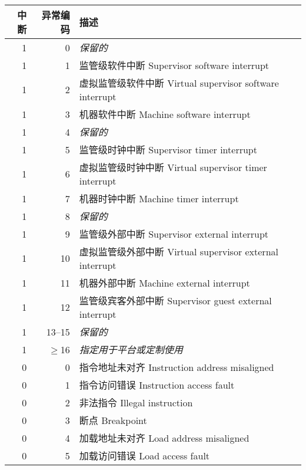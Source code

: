 \begin{table*}[p]
\begin{center}
\begin{tabular}{|r|r|l|l|}
  \hline
  中断      & 异常编码        & 描述 \\
  \hline
  1         & 0               & {\em 保留的} \\
  1         & 1               & 监管级软件中断  Supervisor software interrupt \\
  1         & 2               & 虚拟监管级软件中断  Virtual supervisor software interrupt \\
  1         & 3               & 机器软件中断  Machine software interrupt \\ \hline
  1         & 4               & {\em 保留的} \\
  1         & 5               & 监管级时钟中断   Supervisor timer interrupt \\
  1         & 6               & 虚拟监管级时钟中断  Virtual supervisor timer interrupt \\
  1         & 7               & 机器时钟中断   Machine timer interrupt \\ \hline
  1         & 8               & {\em 保留的} \\
  1         & 9               & 监管级外部中断  Supervisor external interrupt \\
  1         & 10              & 虚拟监管级外部中断  Virtual supervisor external interrupt \\
  1         & 11              & 机器外部中断  Machine external interrupt \\ \hline
  1         & 12              & 监管级宾客外部中断  Supervisor guest external interrupt \\
  1         & 13--15          & {\em 保留的} \\
  1         & $\ge$16         & {\em 指定用于平台或定制使用} \\ \hline
  0         & 0               & 指令地址未对齐  Instruction address misaligned \\
  0         & 1               & 指令访问错误  Instruction access fault \\
  0         & 2               & 非法指令 Illegal instruction \\
  0         & 3               & 断点  Breakpoint \\
  0         & 4               & 加载地址未对齐 Load address misaligned \\
  0         & 5               & 加载访问错误  Load access fault \\

\end{tabular}
\end{center}
\end{table*}
